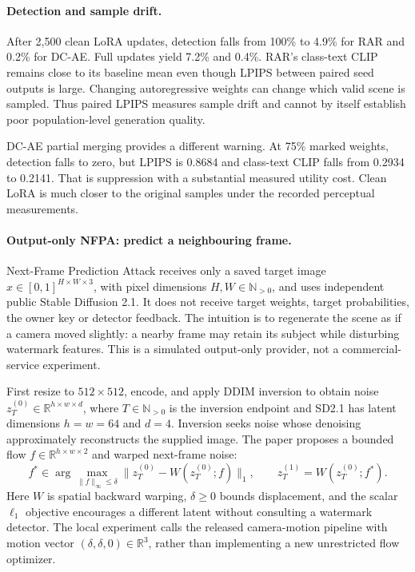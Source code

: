 

\paragraph{Detection and sample drift.} After 2,500 clean LoRA updates, detection falls from 100\% to 4.9\% for RAR and 0.2\% for DC-AE. Full updates yield 7.2\% and 0.4\%. RAR's class-text CLIP remains close to its baseline mean even though LPIPS between paired seed outputs is large. Changing autoregressive weights can change which valid scene is sampled. Thus paired LPIPS measures sample drift and cannot by itself establish poor population-level generation quality.

DC-AE partial merging provides a different warning. At 75\% marked weights, detection falls to zero, but LPIPS is 0.8684 and class-text CLIP falls from 0.2934 to 0.2141. That is suppression with a substantial measured utility cost. Clean LoRA is much closer to the original samples under the recorded perceptual measurements.

\paragraph{Output-only NFPA: predict a neighbouring frame.} Next-Frame Prediction Attack \citep{qiu2025nfpa} receives only a saved target image $x\in[0,1]^{H\times W\times3}$, with pixel dimensions $H,W\in\mathbb N_{>0}$, and uses independent public Stable Diffusion 2.1. It does not receive target weights, target probabilities, the owner key or detector feedback. The intuition is to regenerate the scene as if a camera moved slightly: a nearby frame may retain its subject while disturbing watermark features. This is a simulated output-only provider, not a commercial-service experiment.

First resize to $512\times512$, encode, and apply DDIM inversion to obtain noise $z_T^{(0)}\in\mathbb R^{h\times w\times d}$, where $T\in\mathbb N_{>0}$ is the inversion endpoint and SD2.1 has latent dimensions $h=w=64$ and $d=4$. Inversion seeks noise whose denoising approximately reconstructs the supplied image. The paper proposes a bounded flow $f\in\mathbb R^{h\times w\times2}$ and warped next-frame noise:
\[
f^*\in\arg\max_{\|f\|_\infty\leq\delta}
 \|z_T^{(0)}-W(z_T^{(0)};f)\|_1,
\qquad z_T^{(1)}=W(z_T^{(0)};f^*).
\]
Here $W$ is spatial backward warping, $\delta\geq0$ bounds displacement, and the scalar $\ell_1$ objective encourages a different latent without consulting a watermark detector. The local experiment calls the released camera-motion pipeline with motion vector $(\delta,\delta,0)\in\mathbb R^3$, rather than implementing a new unrestricted flow optimizer.


